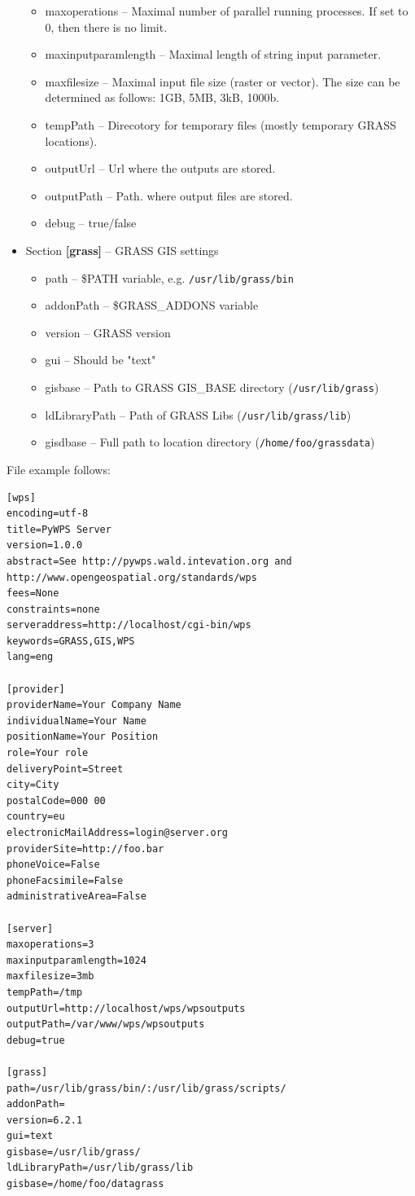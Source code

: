 \documentclass[a4paper,11pt]{article}
\begin{document}
\begin{itemize}
\begin{itemize}
            \item maxoperations -- Maximal number of parallel running
            processes. If set to 0, then there is no limit.
            \item maxinputparamlength -- Maximal length of string input
            parameter.
            \item maxfilesize -- Maximal input file size (raster or
            vector). The size can be determined as follows: 1GB, 5MB, 3kB,
            1000b.
            \item tempPath -- Direcotory for temporary files (mostly
            temporary GRASS locations).
            \item outputUrl -- Url where the outputs are stored.
            \item outputPath -- Path. where output files are stored.
            \item debug -- true/false
        \end{itemize}
    \item Section \textbf{[grass]} -- GRASS GIS settings
        \begin{itemize}
            \item path -- \$PATH variable, e.g. \texttt{/usr/lib/grass/bin}
            \item addonPath -- \$GRASS\_ADDONS variable
            \item version -- GRASS version
            \item gui -- Should be "text"
            \item gisbase -- Path to GRASS GIS\_BASE directory
            (\texttt{/usr/lib/grass})
            \item ldLibraryPath -- Path of GRASS Libs
            (\texttt{/usr/lib/grass/lib})
	    \item gisdbase -- Full path to location directory 
	    (\texttt{/home/foo/grassdata})
        \end{itemize}
\end{itemize}

File example follows:
\begin{verbatim}
[wps]
encoding=utf-8
title=PyWPS Server
version=1.0.0
abstract=See http://pywps.wald.intevation.org and http://www.opengeospatial.org/standards/wps
fees=None
constraints=none
serveraddress=http://localhost/cgi-bin/wps
keywords=GRASS,GIS,WPS
lang=eng

[provider]
providerName=Your Company Name
individualName=Your Name
positionName=Your Position
role=Your role
deliveryPoint=Street
city=City
postalCode=000 00
country=eu
electronicMailAddress=login@server.org
providerSite=http://foo.bar
phoneVoice=False
phoneFacsimile=False
administrativeArea=False

[server]
maxoperations=3
maxinputparamlength=1024
maxfilesize=3mb
tempPath=/tmp
outputUrl=http://localhost/wps/wpsoutputs
outputPath=/var/www/wps/wpsoutputs
debug=true

[grass]
path=/usr/lib/grass/bin/:/usr/lib/grass/scripts/
addonPath=
version=6.2.1
gui=text
gisbase=/usr/lib/grass/
ldLibraryPath=/usr/lib/grass/lib
gisbase=/home/foo/datagrass
\end{verbatim}
    
\end{document}

